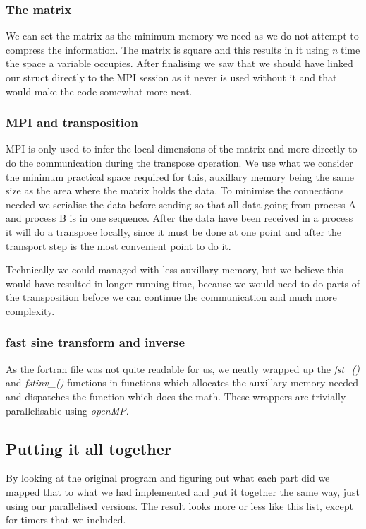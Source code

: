 \subsubsection{The matrix}
We can set the matrix as the minimum memory we need as we do not attempt to
compress the information. The matrix is square and this results in it using
\emph{n} time the space a variable occupies. After finalising we saw that we
should have linked our struct directly to the MPI session as it never is used
without it and that would make the code somewhat more neat. 

\subsubsection{MPI and transposition}
MPI is only used to infer the local dimensions of the matrix and more directly
to do the communication during the transpose operation. We use what we consider
the minimum practical space required for this, auxillary memory being the same
size as the area where the matrix holds the data. To minimise the connections
needed we serialise the data before sending so that all data going from process
A and process B is in one sequence. After the data have been received in a
process it will do a transpose locally, since it must be done at one point and
after the transport step is the most convenient point to do it. 

Technically we could managed with less auxillary memory, but we believe this
would have resulted in longer running time, because we would need to do parts
of the transposition before we can continue the communication and much more
complexity. 

\subsubsection{fast sine transform and inverse }
As the fortran file was not quite readable for us, we neatly wrapped up the
\emph{fst_()} and \emph{fstinv_()} functions in functions which allocates the
auxillary memory needed and dispatches the function which does the math. These
wrappers are trivially parallelisable using \emph{openMP}. 

\subsection{Putting it all together} 
By looking at the original program and figuring out what each part did we
mapped that to what we had implemented and put it together the same way, just
using our parallelised versions. The result looks more or less like this list,
except for timers that we included. 

